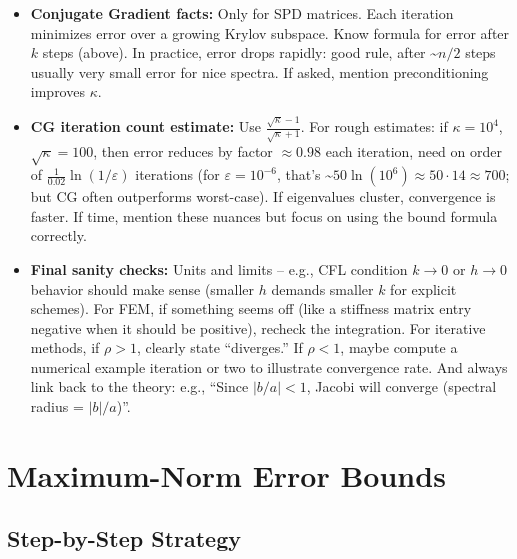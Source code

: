 \documentclass[a4paper,11pt]{article}
\begin{document}
\begin{itemize}[leftmargin=*]
    \item \textbf{Conjugate Gradient facts:} Only for SPD matrices. Each iteration minimizes error over a growing Krylov subspace. Know formula for error after $k$ steps (above). In practice, error drops rapidly: good rule, after \textasciitilde$n/2$ steps usually very small error for nice spectra. If asked, mention preconditioning improves $\kappa$.

    \item \textbf{CG iteration count estimate:} Use $\frac{\sqrt{\kappa}-1}{\sqrt{\kappa}+1}$. For rough estimates: if $\kappa = 10^4$, $\sqrt{\kappa}=100$, then error reduces by factor $\approx0.98$ each iteration, need on order of $\frac{1}{0.02}\ln(1/\varepsilon)$ iterations (for $\varepsilon=10^{-6}$, that's \textasciitilde$50\ln(10^6)\approx 50\cdot14 \approx 700$; but CG often outperforms worst-case). If eigenvalues cluster, convergence is faster. If time, mention these nuances but focus on using the bound formula correctly.

    \item \textbf{Final sanity checks:} Units and limits -- e.g., CFL condition $k \to 0$ or $h \to 0$ behavior should make sense (smaller $h$ demands smaller $k$ for explicit schemes). For FEM, if something seems off (like a stiffness matrix entry negative when it should be positive), recheck the integration. For iterative methods, if $\rho>1$, clearly state ``diverges.'' If $\rho<1$, maybe compute a numerical example iteration or two to illustrate convergence rate. And always link back to the theory: e.g., ``Since $|b/a|<1$, Jacobi will converge (spectral radius = $|b|/a$)''.
\end{itemize}

\section{Maximum-Norm Error Bounds}

\subsection{Step-by-Step Strategy}
\end{document}
